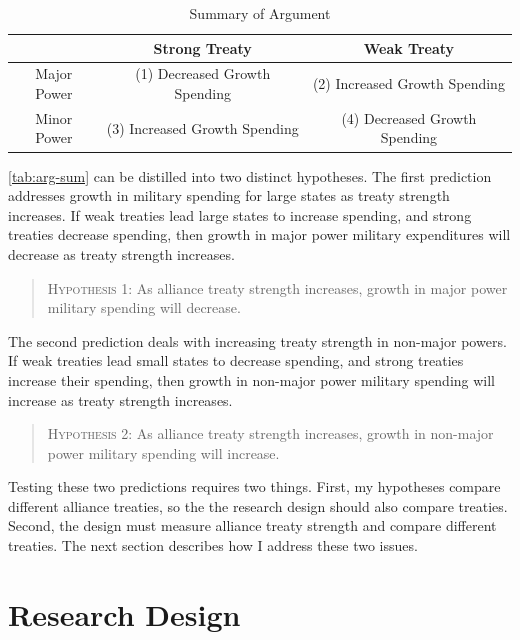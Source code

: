 \documentclass[12pt]{article}
\begin{document}
\begin{table}
\begin{center}
\begin{tabular}{ccc}
      & Strong Treaty      & Weak Treaty  \\
\hline
Major Power & (1)  Decreased Growth Spending   & (2)  Increased Growth Spending        \\
\hline
Minor Power & (3) Increased Growth Spending   & (4) Decreased Growth Spending       \\ 
\hline 
\end{tabular}
\end{center}
\caption{Summary of Argument}
\label{tab:arg-sum}
\end{table}


\autoref{tab:arg-sum} can be distilled into two distinct hypotheses. 
The first prediction addresses growth in military spending for large states as treaty strength increases. 
If weak treaties lead large states to increase spending, and strong treaties decrease spending, then growth in major power military expenditures will decrease as treaty strength increases. 


\begin{quote}
\textsc{Hypothesis 1}: As alliance treaty strength increases, growth in major power military spending will decrease. 
\end{quote}


The second prediction deals with increasing treaty strength in non-major powers. 
If weak treaties lead small states to decrease spending, and strong treaties increase their spending, then growth in non-major power military spending will increase as treaty strength increases. 


\begin{quote}
\textsc{Hypothesis 2}: As alliance treaty strength increases, growth in non-major power military spending will increase. 
\end{quote}


Testing these two predictions requires two things. 
First, my hypotheses compare different alliance treaties, so the the research design should also compare treaties. 
Second, the design must measure alliance treaty strength and compare different treaties.  
The next section describes how I address these two issues. 


\section{Research Design} 
\end{document}
